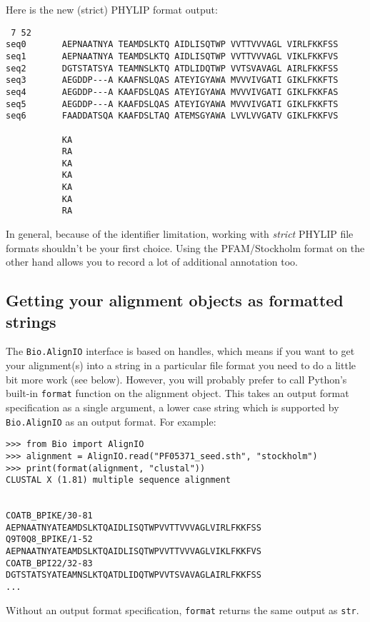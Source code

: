 \noindent Here is the new (strict) PHYLIP format output:
\begin{verbatim}
 7 52
seq0       AEPNAATNYA TEAMDSLKTQ AIDLISQTWP VVTTVVVAGL VIRLFKKFSS
seq1       AEPNAATNYA TEAMDSLKTQ AIDLISQTWP VVTTVVVAGL VIKLFKKFVS
seq2       DGTSTATSYA TEAMNSLKTQ ATDLIDQTWP VVTSVAVAGL AIRLFKKFSS
seq3       AEGDDP---A KAAFNSLQAS ATEYIGYAWA MVVVIVGATI GIKLFKKFTS
seq4       AEGDDP---A KAAFDSLQAS ATEYIGYAWA MVVVIVGATI GIKLFKKFAS
seq5       AEGDDP---A KAAFDSLQAS ATEYIGYAWA MVVVIVGATI GIKLFKKFTS
seq6       FAADDATSQA KAAFDSLTAQ ATEMSGYAWA LVVLVVGATV GIKLFKKFVS

           KA
           RA
           KA
           KA
           KA
           KA
           RA
\end{verbatim}

\noindent In general, because of the identifier limitation, working with
\textit{strict} PHYLIP file formats shouldn't be your first choice.
Using the PFAM/Stockholm format on the other hand allows you to record a lot of additional annotation too.

\subsection{Getting your alignment objects as formatted strings}
\label{sec:alignment-format}
The \verb|Bio.AlignIO| interface is based on handles, which means if you want to get your alignment(s) into a string in a particular file format you need to do a little bit more work (see below).
However, you will probably prefer to call Python's built-in \verb|format| function on the alignment object.
This takes an output format specification as a single argument, a lower case string which is supported by \verb|Bio.AlignIO| as an output format.  For example:

\begin{verbatim}
>>> from Bio import AlignIO
>>> alignment = AlignIO.read("PF05371_seed.sth", "stockholm")
>>> print(format(alignment, "clustal"))
CLUSTAL X (1.81) multiple sequence alignment


COATB_BPIKE/30-81                   AEPNAATNYATEAMDSLKTQAIDLISQTWPVVTTVVVAGLVIRLFKKFSS
Q9T0Q8_BPIKE/1-52                   AEPNAATNYATEAMDSLKTQAIDLISQTWPVVTTVVVAGLVIKLFKKFVS
COATB_BPI22/32-83                   DGTSTATSYATEAMNSLKTQATDLIDQTWPVVTSVAVAGLAIRLFKKFSS
...
\end{verbatim}

Without an output format specification, \verb|format| returns the same output as \verb|str|.

